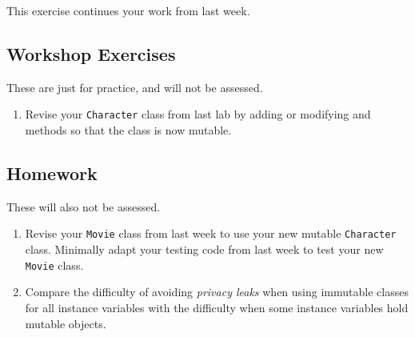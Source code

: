 \documentclass[a4paper]{article}
\begin{document}
%
This exercise continues your work from last week.

\subsection*{Workshop Exercises}
These are just for practice, and will not be assessed.
\begin{enumerate}
\item Revise your \texttt{Character} class from last lab by adding or modifying and methods so that the class is now mutable.
\end{enumerate}

\subsection*{Homework}
These will also not be assessed.
\begin{enumerate}[resume]
\item Revise your \texttt{Movie} class from last week to use your new mutable \texttt{Character} class. Minimally adapt your testing code from last
  week to test your new \texttt{Movie} class.

\item Compare the difficulty of avoiding \emph{privacy leaks} when
  using immutable classes for all instance variables with the
  difficulty when some instance variables hold mutable objects.
\end{enumerate}
\end{document}
